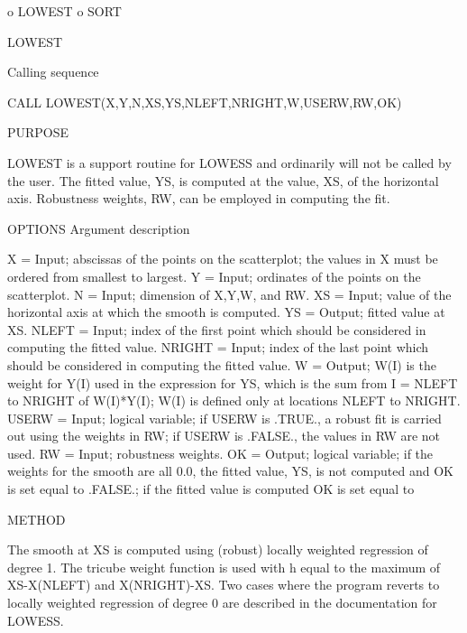 \begin{DoxyVerb}  o LOWEST
  o SORT

LOWEST

Calling sequence

     CALL LOWEST(X,Y,N,XS,YS,NLEFT,NRIGHT,W,USERW,RW,OK)

PURPOSE

    LOWEST is a support routine for LOWESS and ordinarily will
    not be called by the user. The fitted value, YS, is
    computed at the value, XS, of the horizontal axis.
    Robustness weights, RW, can be employed in computing the
    fit.

OPTIONS
     Argument description

      X =       Input; abscissas of the points on the
                scatterplot; the values in X must be ordered
                from smallest to largest.
      Y =       Input; ordinates of the points on the
                scatterplot.
      N =       Input; dimension of X,Y,W, and RW.
      XS =      Input; value of the horizontal axis at which the
                smooth is computed.
      YS =      Output; fitted value at XS.
      NLEFT =   Input; index of the first point which should be
                considered in computing the fitted value.
      NRIGHT =  Input; index of the last point which should be
                considered in computing the fitted value.
      W =       Output; W(I) is the weight for Y(I) used in the
                expression for YS, which is the sum from
                I = NLEFT to NRIGHT of W(I)*Y(I); W(I) is
                defined only at locations NLEFT to NRIGHT.
      USERW =   Input; logical variable; if USERW is .TRUE., a
                robust fit is carried out using the weights in
                RW; if USERW is .FALSE., the values in RW are
                not used.
      RW =      Input; robustness weights.
      OK =      Output; logical variable; if the weights for the
                smooth are all 0.0, the fitted value, YS, is not
                computed and OK is set equal to .FALSE.; if the
                fitted value is computed OK is set equal to

METHOD

     The smooth at XS is computed using (robust) locally weighted
     regression of degree 1. The tricube weight function is used
     with h equal to the maximum of XS-X(NLEFT) and X(NRIGHT)-XS.
     Two cases where the program reverts to locally weighted
     regression of degree 0 are described in the documentation
     for LOWESS.
\end{DoxyVerb}


